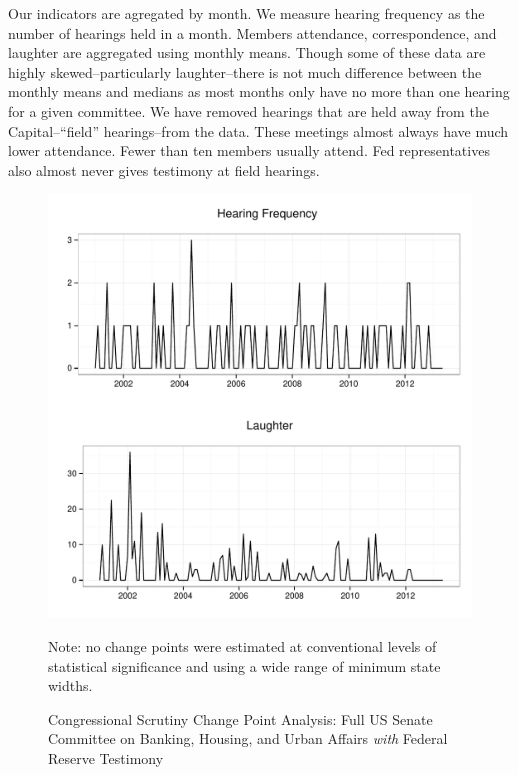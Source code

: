 \documentclass[a4paper]{article}\usepackage[]{graphicx}\usepackage[]{color}
\newenvironment{knitrout}{}{} %
\begin{document}
Our indicators are agregated by month. We measure hearing frequency as the number of hearings held in a month. Members attendance, correspondence, and laughter are aggregated using monthly means. Though some of these data are highly skewed--particularly laughter--there is not much difference between the monthly means and medians as most months only have no more than one hearing for a given committee. We have removed hearings that are held away from the Capital--``field'' hearings--from the data. These meetings almost always have much lower attendance. Fewer than ten members usually attend. Fed representatives also almost never gives testimony at field hearings.

\begin{figure}
    \caption{Congressional Scrutiny Change Point Analysis: Full US Senate Committee on Banking, Housing, and Urban Affairs \emph{with} Federal Reserve Testimony}
    \label{fig:SenateFedCP}
\begin{knitrout}
\color{fgcolor}

{\centering \includegraphics[width=0.8\linewidth]{figure/ScrutinySenate} 

}



\end{knitrout}
{\scriptsize{Note: no change points were estimated at conventional levels of statistical significance and using a wide range of minimum state widths.}}
\end{figure}
\end{document}
